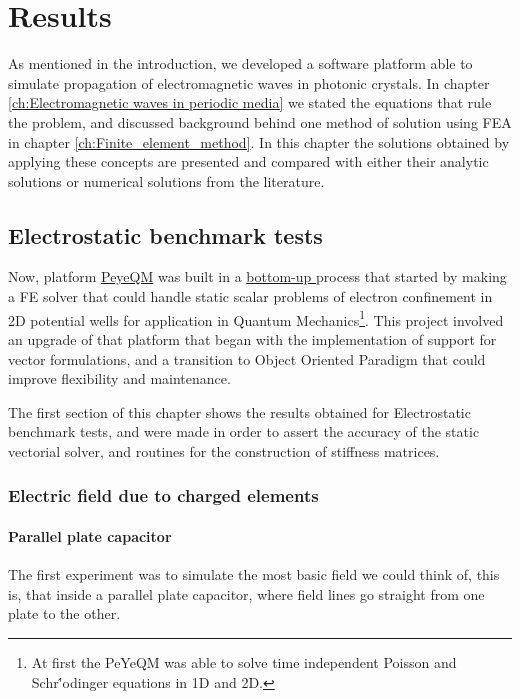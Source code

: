 \chapter{Results}
\label{ch:Results}
As mentioned in the introduction, we developed a software platform able to simulate propagation of electromagnetic waves in photonic crystals. In chapter \ref{ch:Electromagnetic waves in periodic media} we stated the equations that rule the problem, and discussed background behind one method of solution using FEA in chapter \ref{ch:Finite_element_method}. In this chapter the solutions obtained by applying these concepts are presented and compared with either their analytic solutions or numerical solutions from the literature.

\section{Electrostatic benchmark tests}

Now, platform \href{https://github.com/bebopsan/peyeQM}{PeyeQM} was built in a \href{en.wikipedia.org/wiki/Top-down_and_bottom-up_design}{bottom-up } process that started by making a FE solver that could handle static scalar problems of electron confinement in 2D potential wells for application in Quantum Mechanics\footnote{At first the PeYeQM was able to solve time independent Poisson and Schr\''odinger equations in 1D and 2D.}. This project involved an upgrade of that platform that began with the implementation of support for vector formulations, and a transition to Object Oriented Paradigm that could improve flexibility and maintenance.

The first section of this chapter shows the results obtained for Electrostatic benchmark tests, and were made in order to assert the accuracy of the static vectorial solver, and  routines for the construction of stiffness matrices.

\subsection{Electric field due to charged elements}
\subsubsection{Parallel plate capacitor}
The first experiment was to simulate the most basic field we could think of, this is, that inside a parallel plate capacitor, where field lines go straight from one plate to the other. 

